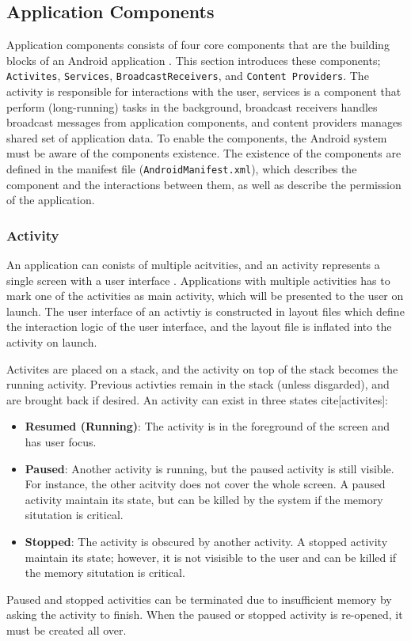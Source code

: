 \subsection{Application Components}
Application components consists of four core components that are the building blocks of an Android application \cite{appfundamentals}. This section introduces these components; \verb|Activites|, \verb|Services|, \verb|BroadcastReceivers|, and \verb|Content Providers|. The activity is responsible for interactions with the user, services is a component that perform (long-running) tasks in the background, broadcast receivers handles broadcast messages from application components, and content providers manages shared set of application data. To enable the components, the Android system must be aware of the components existence. The existence of the components are defined in the manifest file (\verb|AndroidManifest.xml|), which describes the component and the interactions between them, as well as describe the permission of the application. 


\subsubsection{Activity}
An application can conists of multiple acitvities, and an activity represents a single screen with a user interface \cite{activities}. Applications with multiple activities has to mark one of the activities as main activity, which will be presented to the user on launch. The user interface of an activtiy is constructed in layout files which define the interaction logic of the user interface, and the layout file is inflated into the activity on launch. 

Activites are placed on a stack, and the activity on top of the stack becomes the running activity. Previous activties remain in the stack (unless disgarded), and are brought back if desired.  An activity can exist in three states cite[activites]:

\begin{itemize}
    \item \textbf{Resumed (Running)}: The activity is in the foreground of the screen and has user focus. 
    \item \textbf{Paused}: Another activity is running, but the paused activity is still visible. For instance, the other acitvity does not cover the whole screen. A paused activity maintain its state, but can be killed by the system if the memory situtation is critical.  
    \item \textbf{Stopped}: The activity is obscured by another activity. A stopped activity maintain its state; however, it is not visisible to the user and can be killed if the memory situtation is critical.
\end{itemize}
Paused and stopped activities can be terminated due to insufficient memory by asking the activity to finish. When the paused or stopped activity is re-opened, it must be created all over. 

